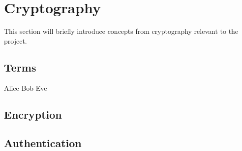 \section{Cryptography}
This section will briefly introduce concepts from cryptography relevant to the project.

\subsection{Terms}
Alice
Bob 
Eve


\subsection{Encryption}

\subsection{Authentication}
